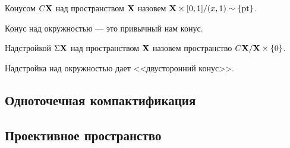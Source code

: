 \begin{Def}
    [Конус]
    Конусом $C\mathbf{X}$ над пространством $\mathbf{X}$ назовем $\mathbf{X} \times [0,1] / (x,1) \sim \{\mathrm{pt}\}$.
\end{Def}
\begin{Ex}
    Конус над окружностью --- это привычный нам конус. 
\end{Ex}

\begin{Def}
    [Надстройка]
    Надстройкой $\Sigma \mathbf{X}$ над пространством $\mathbf{X}$ назовем пространство $C\mathbf{X} / \mathbf{X} \times \{0\}$.
\end{Def}

\begin{Ex}
    Надстройка над окружностью дает <<двусторонний конус>>.
\end{Ex}
\subsection{Одноточечная компактификация}
\subsection{Проективное пространство}

